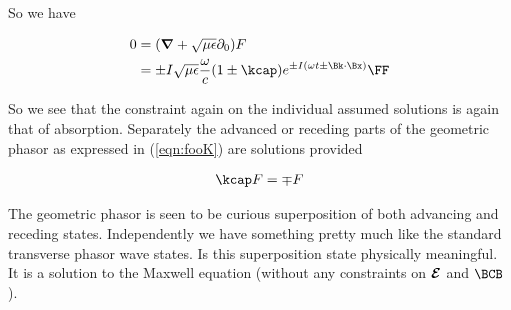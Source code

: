 So we have

\begin{align*}
0 
&= (\spacegrad + \sqrt{\mu\epsilon}\partial_0) F \\
&= 
{\pm I}\sqrt{\mu\epsilon}\frac{\omega}{c}(1 \pm \kcap) e^{\pm I(\omega t \pm \Bk \cdot \Bx)} \FF
\end{align*}

So we see that the constraint again on the individual assumed solutions is again that of absorption.  Separately the advanced or receding parts of the geometric phasor as expressed in (\ref{eqn:fooK}) are solutions provided

\begin{align}\label{eqn:fooN}
\kcap F = \mp F
\end{align}

The geometric phasor is seen to be curious superposition of both advancing and receding states.  Independently we have something pretty much like the standard transverse phasor wave states.  Is this superposition state physically meaningful.  It is a solution to the Maxwell equation (without any constraints on $\boldsymbol{\mathcal{E}}$ and $\BCB$).

\EndArticle
